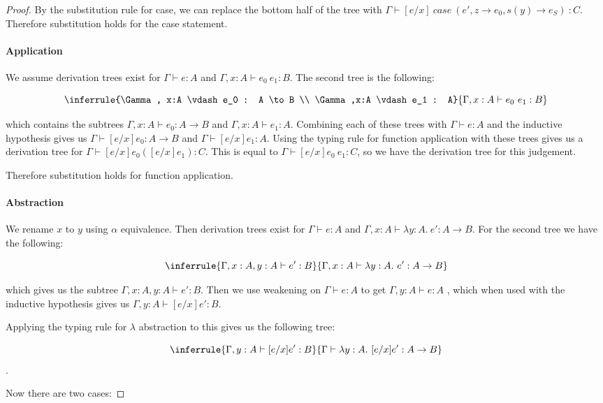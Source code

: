 \begin{proof}
By the substitution rule for case, we can replace the bottom half of the tree with $\Gamma \vdash [e/x] \ case \ (e', z \to e_0 , s(y) \to e_S) \  : C$. Therefore substitution holds for the case statement. 

\paragraph{Application} We assume derivation trees exist for $\Gamma \vdash e : A$ and $\Gamma, x : A \vdash e_0 \ e_1 : B$. The second tree is the following:

$$
\inferrule{\Gamma , x:A \vdash e_0 : A \to B \\  \Gamma ,x:A \vdash e_1 : A}
  {\Gamma, x : A \vdash e_0 \ e_1 : B}$$

which contains the subtrees $\Gamma, x:A \vdash e_0 : A \to B$ and $\Gamma, x:A \vdash e_1 : A$. Combining each of these trees with $\Gamma \vdash e : A$ and the inductive hypothesis gives us $\Gamma \vdash [e/x]e_0 : A \to B$ and $\Gamma \vdash [e/x]e_1 : A$. Using the typing rule for function application with these trees gives us a derivation tree for $\Gamma \vdash [e/x]e_0 ([e/x]e_1) : C$. This is equal to $\Gamma \vdash [e/x]e_0 \ e_1 : C$, so we have the derivation tree for this judgement.

Therefore substitution holds for function application.

\paragraph{Abstraction} We rename $x$ to $y$ using $\alpha$ equivalence. Then derivation trees exist for $\Gamma \vdash e : A$ and $\Gamma, x : A \vdash \lambda y : A. \ e' : A \to B$. For the second tree we have the following:

$$\inferrule{\Gamma, x : A, y : A \vdash e' : B}{\Gamma, x:A \vdash \lambda y:A. \ e' : A \to B}$$

which gives us the subtree $\Gamma, x : A, y : A \vdash e' : B$. Then we use weakening on $\Gamma \vdash e : A$ to get $\Gamma, y : A \vdash e : A$
, which when used with the inductive hypothesis gives us $\Gamma, y : A \vdash [e/x]e' : B$. 


Applying the typing rule for $\lambda$ abstraction to this gives us the following tree:

$$\inferrule{\Gamma, y : A \vdash [e/x]e' : B}{\Gamma \vdash \lambda y:A. \ [e/x]e' : A \to B}$$.

Now there are two cases:


\end{proof}
